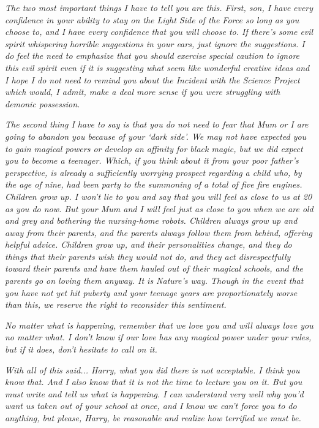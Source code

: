 \emph{The two most important things I have to tell you are this. First,
son, I have} \emph{every} \emph{confidence in your ability to stay on
the Light Side of the Force so long as you choose to, and I have every
confidence that you will choose to. If there's some evil spirit
whispering horrible suggestions in your ears, just ignore the
suggestions. I} \emph{do} \emph{feel the need to emphasize that you
should exercise special caution to ignore this evil spirit even if it is
suggesting what seem like wonderful creative ideas and I hope I do not
need to remind you about the Incident with the Science Project which
would, I admit, make a deal more sense if you were struggling with
demonic possession.}

\emph{The second thing I have to say is that you do not need to fear
that Mum or I are going to abandon you because of your `dark side'. We
may not have expected you to gain magical powers or develop an affinity
for black magic, but we did expect you to become a teenager. Which, if
you think about it from your poor father's perspective, is already a
sufficiently worrying prospect regarding a child who, by the age of
nine, had been party to the summoning of a total of five fire engines.
Children grow up. I won't lie to you and say that you will feel as close
to us at 20 as you do now. But your Mum and I will feel just as close to
you when we are old and grey and bothering the nursing-home robots.
Children always grow up and away from their parents, and the parents
always follow them from behind, offering helpful advice. Children grow
up, and their personalities change, and they do things that their
parents wish they would not do, and they act disrespectfully toward
their parents and have them hauled out of their magical schools, and the
parents go on loving them anyway. It is Nature's way. Though in the
event that you have not yet hit puberty and your teenage years are
proportionately worse than this, we reserve the right to reconsider this
sentiment.}

\emph{No matter what is happening, remember that we love you and will
always love you no matter what. I don't know if our love has any magical
power under your rules, but if it does, don't hesitate to call on it.}

\emph{With all of this said... Harry, what you did there is not
acceptable. I think you know that. And I also know that it is not the
time to lecture you on it. But you must write and tell us what is
happening. I can understand very well why you'd want us taken out of
your school at once, and I know we can't force you to do anything, but
please, Harry, be reasonable and realize how terrified we must be.}

